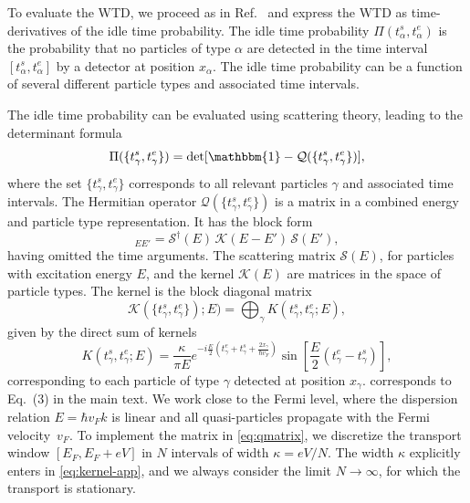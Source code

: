 \documentclass[aps,prl,amsmath,twocolumn,floatfix,superscriptaddress,longbibliography,footinbib]{revtex4-1}
\begin{document}
To evaluate the WTD, we proceed as in Ref.~\cite{Dasenbrook2015} and express the WTD as time-derivatives of the idle time probability. The idle time probability $\Pi(t^s_\alpha,t^{e}_\alpha)$ is the probability that no particles of type $\alpha$ are detected in the time interval $[t^s_\alpha,t^{e}_\alpha]$ by a detector at position $x_\alpha$. The idle time probability can be a function of several different particle types and associated time intervals. 

The idle time probability can be evaluated using scattering theory, leading to the determinant formula~\cite{Dasenbrook2015}
\begin{equation}
	\Pi(\{t^{s}_\gamma, t^{e}_\gamma\})= \det[\mathbbm{1} - \mathcal{Q}(\{t^{s}_{\gamma}, t^{e}_{\gamma} \})] ,
	\label{eq:ITP}
\end{equation}
where the set $\{t^{s}_\gamma, t^{e}_\gamma\}$ corresponds to all relevant particles $\gamma$ and associated time intervals. The Hermitian operator $\mathcal{Q}(\{t^{s}_\gamma, t^{e}_\gamma\})$ is a matrix in a combined energy and particle type representation. It has the block form
\begin{equation}
	[\mathcal{Q}]_{EE'} = \mathcal{S}^{\dagger}(E)\, \mathcal{K}(E-E')\,\mathcal{S}(E'),
	\label{eq:qmatrix}
\end{equation}
having omitted the time arguments. The scattering matrix $\mathcal{S}(E)$, for particles with excitation energy $E$, and the kernel $\mathcal{K}(E)$ are matrices in the space of particle types. The kernel is the block diagonal matrix
\begin{equation}
	\mathcal{K}(\{t^{s}_\gamma, t^{e}_\gamma\});E) =\bigoplus_{\gamma} K( t^{s}_\gamma, t^{e}_\gamma; E)\label{eq:K-kernels} ,
\end{equation}
given by the direct sum of kernels
\begin{equation}
	K(t^{s}_\gamma, t^{e}_\gamma; E)
	=\frac{\kappa}{\pi E} e^{-i \frac{E}{2} \left(t^{e}_\gamma+t^{s}_\gamma+\frac{2x_\gamma}{\hbar v_F}\right)}
	\sin \left[ \frac{E}{2}(t^{e}_\gamma-t^s_\gamma) \right],
	\label{eq:kernel-app}
\end{equation}
corresponding to each particle of type $\gamma$ detected at position $x_\gamma$.  corresponds to Eq.~(3) in the main text. 
We work close to the Fermi level, where the dispersion relation $E\!=\!\hbar v_Fk$ is linear and all quasi-particles propagate with the Fermi velocity~$v_F$. To implement the matrix in \cref{eq:qmatrix}, we discretize the transport window $[E_F,E_F+eV]$ in $N$ intervals of width $\kappa\!=\!eV/N$. The width $\kappa$ explicitly enters in \cref{eq:kernel-app}, and we always consider the limit $N\!\rightarrow\!\infty$, for which the transport is stationary. 
\end{document}
